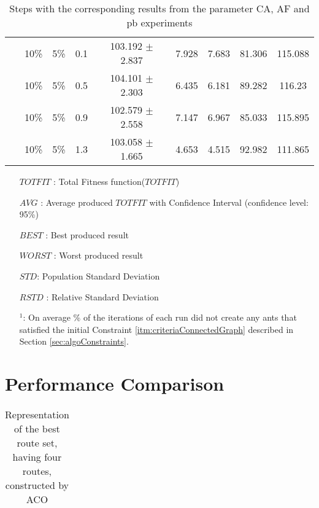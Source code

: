 \begin{sidewaystable}
\begin{tabular}{|l|l|l|c||c|c|c|c|c|}
    ~ & 10\% & 5\% & 0.1 & 103.192 $\pm$ 2.837 & 7.928 & 7.683 & 81.306 & 115.088\\
    ~ & 10\% & 5\% & 0.5 & 104.101 $\pm$ 2.303 & 6.435 & 6.181 & 89.282 & 116.23\\
    ~ & 10\% & 5\% & 0.9 & 102.579 $\pm$ 2.558 & 7.147 & 6.967 & 85.033 & 115.895\\
    ~ & 10\% & 5\% & 1.3 & 103.058 $\pm$ 1.665 & 4.653 & 4.515 & 92.982 & 111.865\\
    \hline
    \end{tabular}
    \caption {Steps with the corresponding results from the parameter CA, AF and pb experiments}
    \tiny
    \begin{itemize}[noitemsep]
    \item[$TOTFIT$ :] Total Fitness function($TOTFIT$)
    \item[$AVG$ :] Average produced $TOTFIT$ with Confidence Interval (confidence level: 95\%)
    \item[$BEST$ :] Best produced result
    \item[$WORST$ :] Worst produced result
    \item[$STD$:] Population Standard Deviation 
    \item[$RSTD$ :] Relative Standard Deviation 
    \item[$^1$:] On average \% of the iterations of each run did not create any ants that satisfied the initial Constraint \ref{itm:criteriaConnectedGraph} described in Section \vref{sec:algoConstraints}.
    \end{itemize}
    \label{table:pm2}
\end{sidewaystable}


\section{Performance Comparison}

\begin{table}[H]
    \centering
    \begin{tabular}{|l|llllllll|}
    \hline
    \hline
    \end{tabular}
    \caption {Representation of the best route set, having four routes, constructed by ACO}
    \label{table:performanceComparison_bestRouteSet4_ACO}
\end{table}

